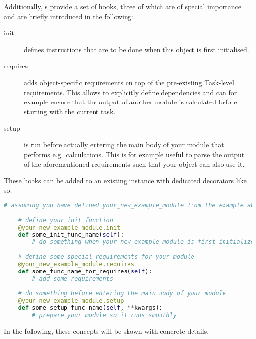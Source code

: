 Additionally, s provide a set of hooks, three of which are of special importance and are briefly introduced in the following:
\begin{description}
	\item[init] defines instructions that are to be done when this object is first initialised.
	\item[requires] adds object-specific requirements on top of the pre-existing Task-level requirements.
	This allows to explicitly define dependencies and can for example ensure that the output of another module is calculated before starting with the current task.
	\item[setup] is run before actually entering the main body of your module that performs e.g.\ calculations.
	This is for example useful to parse the output of the aforementioned requirements such that your object can also use it.
	
\end{description}

These hooks can be added to an existing   instance with dedicated decorators like so:

\begin{lstlisting}[language=python]
	# assuming you have defined your_new_example_module from the example above
	
	# define your init function
	@your_new_example_module.init
	def some_init_func_name(self):
	    # do something when your_new_example_module is first initialized
	    
	# define some special requirements for your module
	@your_new_example_module.requires
	def some_func_name_for_requires(self):
	    # add some requirements
	
	# do something before entering the main body of your module
	@your_new_example_module.setup
	def some_setup_func_name(self, **kwargs):
	    # prepare your module so it runs smoothly
\end{lstlisting}

In the following, these concepts will be shown with concrete details.
